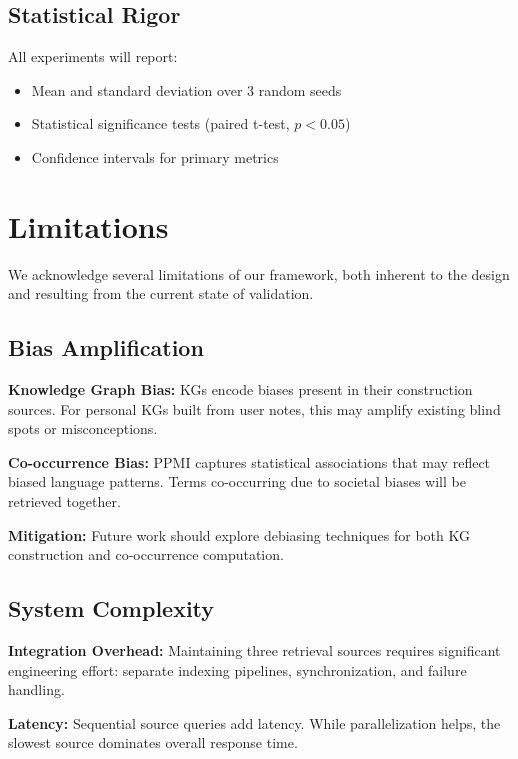 \documentclass[11pt,a4paper]{article}
\begin{document}
\subsection{Statistical Rigor}

All experiments will report:
\begin{itemize}
    \item Mean and standard deviation over 3 random seeds
    \item Statistical significance tests (paired t-test, $p < 0.05$)
    \item Confidence intervals for primary metrics
\end{itemize}

\section{Limitations}
\label{sec:limitations}

We acknowledge several limitations of our framework, both inherent to the design and resulting from the current state of validation.

\subsection{Bias Amplification}

\textbf{Knowledge Graph Bias:} KGs encode biases present in their construction sources. For personal KGs built from user notes, this may amplify existing blind spots or misconceptions.

\textbf{Co-occurrence Bias:} PPMI captures statistical associations that may reflect biased language patterns. Terms co-occurring due to societal biases will be retrieved together.

\textbf{Mitigation:} Future work should explore debiasing techniques for both KG construction and co-occurrence computation.

\subsection{System Complexity}

\textbf{Integration Overhead:} Maintaining three retrieval sources requires significant engineering effort: separate indexing pipelines, synchronization, and failure handling.

\textbf{Latency:} Sequential source queries add latency. While parallelization helps, the slowest source dominates overall response time.
\end{document}
